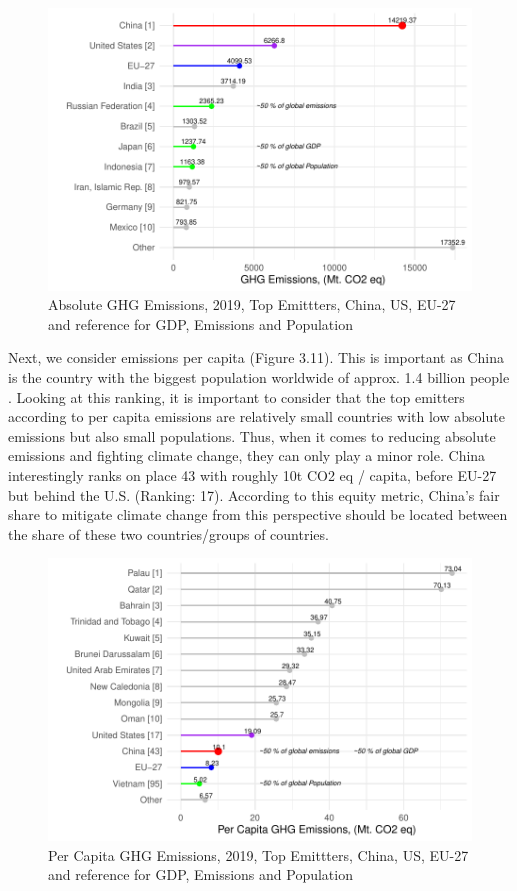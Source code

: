 \documentclass[
  12pt,
]{article}
\numberwithin{equation}{section}
\numberwithin{table}{section}
\numberwithin{figure}{section}
\begin{document}
\begin{figure}
\centering
\includegraphics{Paper_files/figure-latex/unnamed-chunk-13-1.pdf}
\caption{Absolute GHG Emissions, 2019, Top Emittters, China, US, EU-27
and reference for GDP, Emissions and Population}
\end{figure}

Next, we consider emissions per capita (Figure 3.11). This is important
as China is the country with the biggest population worldwide of approx.
1.4 billion people \citep{WorldBank2022c}. Looking at this ranking, it
is important to consider that the top emitters according to per capita
emissions are relatively small countries with low absolute emissions but
also small populations. Thus, when it comes to reducing absolute
emissions and fighting climate change, they can only play a minor role.
China interestingly ranks on place 43 with roughly 10t CO2 eq / capita,
before EU-27 but behind the U.S. (Ranking: 17). According to this equity
metric, China's fair share to mitigate climate change from this
perspective should be located between the share of these two
countries/groups of countries.

\begin{figure}
\centering
\includegraphics{Paper_files/figure-latex/unnamed-chunk-14-1.pdf}
\caption{Per Capita GHG Emissions, 2019, Top Emittters, China, US, EU-27
and reference for GDP, Emissions and Population}
\end{figure}
\end{document}
